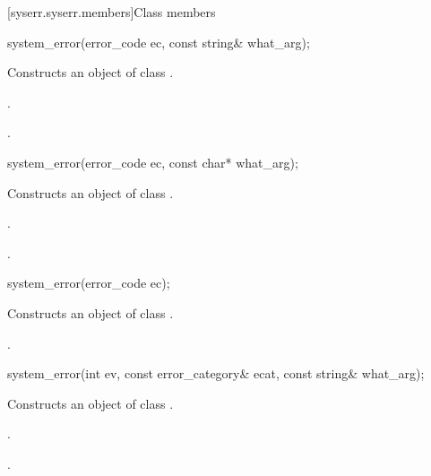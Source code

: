 [syserr.syserr.members]{Class  members}

%
\begin{itemdecl}
system_error(error_code ec, const string& what_arg);
\end{itemdecl}

\begin{itemdescr}
\pnum
\effects Constructs an object of class .

\pnum
\postconditions {}.

.
\end{itemdescr}

%
\begin{itemdecl}
system_error(error_code ec, const char* what_arg);
\end{itemdecl}

\begin{itemdescr}
\pnum
\effects Constructs an object of class .

\pnum
\postconditions {}.

.
\end{itemdescr}

%
\begin{itemdecl}
system_error(error_code ec);
\end{itemdecl}

\begin{itemdescr}
\pnum
\effects Constructs an object of class .

\pnum
\postconditions {}.
\end{itemdescr}

%
\begin{itemdecl}
system_error(int ev, const error_category& ecat,
  const string& what_arg);
\end{itemdecl}

\begin{itemdescr}
\pnum
\effects Constructs an object of class .

\pnum
\postconditions {}.

.
\end{itemdescr}

